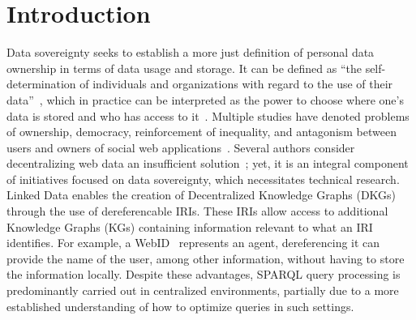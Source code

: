 
\section{Introduction}

Data sovereignty seeks to establish a more just definition of personal data ownership in terms of data usage and storage.
It can be defined as ``the self-determination of individuals and organizations with regard to the use of their data''~\cite{verstraete2022solid},
which in practice can be interpreted as the power to choose where one's data is stored and who has access to it~\cite{verstraete2022solid}.
Multiple studies have denoted problems of ownership, democracy, reinforcement of inequality, and antagonism between users and owners of social web applications~\cite{Terranova2000FreeLP, Curran2016ch1, Sevignani2013, 9663788}.
Several authors consider decentralizing web data an insufficient solution~\cite{9663788, Curran2016ch1}; yet, it is an integral component of initiatives focused on data sovereignty,
which necessitates technical research.
Linked Data enables the creation of Decentralized Knowledge Graphs (DKGs) through the use of dereferencable IRIs.
These IRIs allow access to additional Knowledge Graphs (KGs) containing information relevant to what an IRI identifies.
For example, a WebID~ represents an agent, dereferencing it can provide the name of the user, among other information, without having to store the information locally.
Despite these advantages, SPARQL query processing is predominantly carried out in centralized environments, partially due to a more established understanding of how to optimize queries in such settings.

